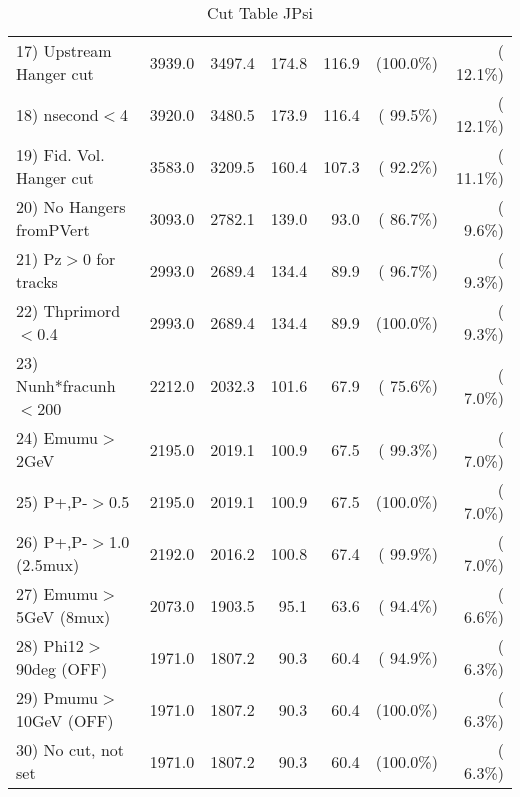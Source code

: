 \begin{table}[h!]
\begin{tabular}{||l||r|r|r|r|r|r||}
 17) Upstream Hanger cut  &       3939.0 &       3497.4 &        174.8 &        116.9 & (100.0\%) & ( 12.1\%) \\
 18) nsecond$<$4          &       3920.0 &       3480.5 &        173.9 &        116.4 & ( 99.5\%) & ( 12.1\%) \\
 19) Fid. Vol. Hanger cut &       3583.0 &       3209.5 &        160.4 &        107.3 & ( 92.2\%) & ( 11.1\%) \\
 20) No Hangers fromPVert &       3093.0 &       2782.1 &        139.0 &         93.0 & ( 86.7\%) & (  9.6\%) \\
 21) Pz$>$0 for tracks    &       2993.0 &       2689.4 &        134.4 &         89.9 & ( 96.7\%) & (  9.3\%) \\
 22) Thprimord$<$0.4      &       2993.0 &       2689.4 &        134.4 &         89.9 & (100.0\%) & (  9.3\%) \\
 23) Nunh*fracunh$<$200   &       2212.0 &       2032.3 &        101.6 &         67.9 & ( 75.6\%) & (  7.0\%) \\
 24) Emumu$>$2GeV         &       2195.0 &       2019.1 &        100.9 &         67.5 & ( 99.3\%) & (  7.0\%) \\
 25) P+,P-$>$0.5          &       2195.0 &       2019.1 &        100.9 &         67.5 & (100.0\%) & (  7.0\%) \\
 26) P+,P-$>$1.0 (2.5mux) &       2192.0 &       2016.2 &        100.8 &         67.4 & ( 99.9\%) & (  7.0\%) \\
 27) Emumu$>$5GeV  (8mux) &       2073.0 &       1903.5 &         95.1 &         63.6 & ( 94.4\%) & (  6.6\%) \\
 28) Phi12$>$90deg  (OFF) &       1971.0 &       1807.2 &         90.3 &         60.4 & ( 94.9\%) & (  6.3\%) \\
 29) Pmumu$>$10GeV  (OFF) &       1971.0 &       1807.2 &         90.3 &         60.4 & (100.0\%) & (  6.3\%) \\
 30) No cut, not set      &       1971.0 &       1807.2 &         90.3 &         60.4 & (100.0\%) & (  6.3\%) \\
 \hline
 \hline
 \end{tabular}
 \caption{Cut Table  JPsi     }
 \label{tab-cutcohjpsi-mumu_cohrhop}
 \end{table}
